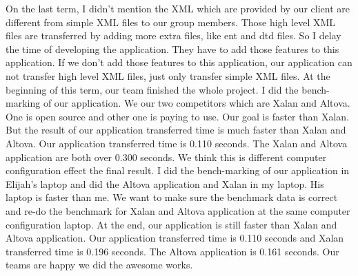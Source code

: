 On the last term, I didn’t mention the XML which are provided by our client are different from simple XML files to our group members.
Those high level XML files are transferred by adding more extra files, like ent and dtd files. 
So I delay the time of developing the application. They have to add those features to this application. 
If we don’t add those features to this application, our application can not transfer high level XML files, just only transfer simple XML files.
At the beginning of this term, our team finished the whole project. 
I did the bench-marking of our application. 
We our two competitors which are Xalan and Altova. 
One is open source and other one is paying to use. 
Our goal is faster than Xalan. 
But the result of our application transferred time is much faster than Xalan and Altova.
Our application transferred time is 0.110 seconds. 
The Xalan and Altova application are both over 0.300 seconds. 
We think this is different computer configuration effect the final result.
I did the bench-marking of our application in Elijah’s laptop and did the Altova application and Xalan in my laptop. 
His laptop is faster than me. 
We want to make sure the benchmark data is correct and re-do the benchmark for Xalan and Altova application at the same computer configuration laptop. 
At the end, our application is still faster than Xalan and Altova application. 
Our application transferred time is 0.110 seconds and Xalan transferred time is 0.196 seconds. 
The Altova application is 0.161 seconds. Our teams are happy we did the awesome works.
